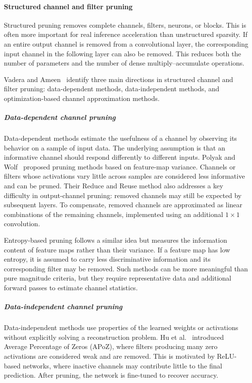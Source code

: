 \documentclass[12pt,a4paper]{report}
\begin{document}
\paragraph{Structured channel and filter pruning}
Structured pruning removes complete channels, filters, neurons, or blocks. This is often more
important for real inference acceleration than unstructured sparsity. If an entire output channel is
removed from a convolutional layer, the corresponding input channel in the following layer can
also be removed. This reduces both the number of parameters and the number of dense
multiply--accumulate operations.

Vadera and Ameen~\cite{vadera2022methods} identify three main directions in structured channel
and filter pruning: data-dependent methods, data-independent methods, and optimization-based
channel approximation methods.

\subparagraph{Data-dependent channel pruning}
Data-dependent methods estimate the usefulness of a channel by observing its behavior on a
sample of input data. The underlying assumption is that an informative channel should respond
differently to different inputs. Polyak and Wolf~\cite{polyak2015channel} proposed pruning
methods based on feature-map variance. Channels or filters whose activations vary little across
samples are considered less informative and can be pruned. Their Reduce and Reuse method also
addresses a key difficulty in output-channel pruning: removed channels may still be expected by
subsequent layers. To compensate, removed channels are approximated as linear combinations of
the remaining channels, implemented using an additional $1 \times 1$ convolution.

Entropy-based pruning follows a similar idea but measures the information content of feature
maps rather than their variance. If a feature map has low entropy, it is assumed to carry less
discriminative information and its corresponding filter may be removed. Such methods can be
more meaningful than pure magnitude criteria, but they require representative data and additional
forward passes to estimate channel statistics.

\subparagraph{Data-independent channel pruning}
Data-independent methods use properties of the learned weights or activations without explicitly
solving a reconstruction problem. Hu et al.~\cite{hu2016network} introduced Average Percentage
of Zeros (APoZ), where filters producing many zero activations are considered weak and are
removed. This is motivated by ReLU-based networks, where inactive channels may contribute
little to the final prediction. After pruning, the network is fine-tuned to recover accuracy.
\end{document}
